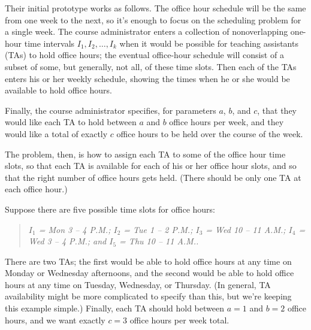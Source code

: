 \documentclass[12pt,letterpaper]{article}
\begin{document}
Their initial prototype works as follows. The office hour schedule will
be the same from one week to the next, so it's enough to focus on the
scheduling problem for a single week. The course administrator enters
a collection of nonoverlapping one-hour time intervals $I_1, I_2, \dots, I_k$ when
it would be possible for teaching assistants (TAs) to hold office hours;
the eventual office-hour schedule will consist of a subset of some, but
generally, not all, of these time slots. Then each of the TAs enters his or
her weekly schedule, showing the times when he or she would be available
to hold office hours.

Finally, the course administrator specifies, for parameters $a$, $b$, and
$c$, that they would like each TA to hold between $a$ and $b$ office hours per
week, and they would like a total of exactly $c$ office hours to be held over
the course of the week.

The problem, then, is how to assign each TA to some of the office hour
time slots, so that each TA is available for each of his or her office hour
slots, and so that the right number of office hours gets held. (There
should be only one TA at each office hour.)

{\eg \rm Suppose there are five possible time slots for office hours:}
\begin{quote}
{\it $I_1$ = Mon 3 -- 4 P.M.; $I_2$ = Tue 1 -- 2 P.M.; $I_3$ = Wed 10 -- 11 A.M.; $I_4$ = Wed 3 -- 4 P.M.; and $I_5$ = Thu 10 -- 11 A.M..}
\end{quote}
There are two TAs; the first would be able to hold office hours at any
time on Monday or Wednesday afternoons, and the second would be able
to hold office hours at any time on Tuesday, Wednesday, or Thursday.
(In general, TA availability might be more complicated to specify than
this, but we're keeping this example simple.) Finally, each TA should hold
between $a = 1$ and $b = 2$ office hours, and we want exactly $c = 3$ office hours
per week total.
\end{document}
